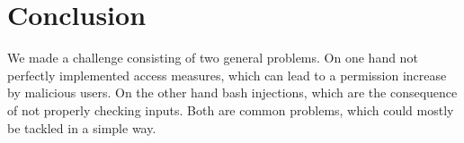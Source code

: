 \documentclass[12pt,a4paper]{article}
\begin{document}
\section{Conclusion}
We made a challenge consisting of two general problems. On one hand not perfectly implemented access measures, which can lead to a permission increase by malicious users. On the other hand bash injections, which are the consequence of not properly checking inputs. Both are common problems, which could mostly be tackled in a simple way.
\end{document}

